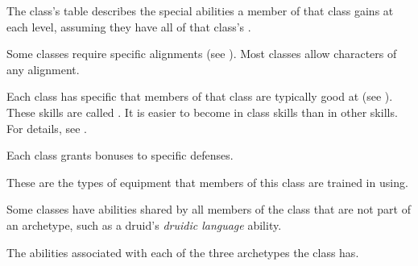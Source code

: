         The class's table describes the special abilities a member of that class gains at each level, assuming they have all of that class's .

        Some classes require specific alignments (see ).
        Most classes allow characters of any alignment.

        Each class has specific  that members of that class are typically good at (see ).
        These skills are called .
        It is easier to become  in class skills than in other skills.
        For details, see .

        Each class grants bonuses to specific defenses.

        These are the types of equipment that members of this class are trained in using.

        Some classes have abilities shared by all members of the class that are not part of an archetype, such as a druid's \textit{druidic language} ability.

        The abilities associated with each of the three archetypes the class has.

\newpage

